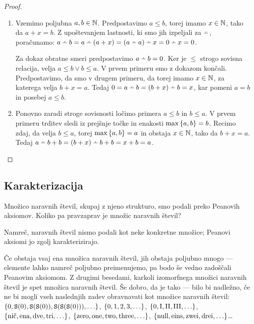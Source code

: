 \begin{proof}
\begin{enumerate}
\item
Vzemimo poljubna $a, b \in \mathbb{N}$. Predpostavimo $a \leq b$, torej imamo $x \in \mathbb{N}$, tako da $a + x = b$. Z upoštevanjem lastnosti, ki smo jih izpeljali za $\monus$, poračunamo: $a \monus b = a \monus (a + x) = (a \monus a) \monus x = 0 \monus x = 0$.

Za dokaz obratne smeri predpostavimo $a \monus b = 0$. Ker je $\leq$ strogo sovisna relacija, velja $a \leq b \lor b \leq a$. V prvem primeru smo z dokazom končali. Predpostavimo, da smo v drugem primeru, da torej imamo $x \in \mathbb{N}$, za katerega velja $b + x = a$. Tedaj $0 = a \monus b = (b + x) \monus b = x$, kar pomeni $a = b$ in posebej $a \leq b$.
\item
Ponovno zaradi stroge sovisnosti ločimo primera $a \leq b$ in $b \leq a$. V prvem primeru trditev sledi iz prejšnje točke in enakosti $\max\set{a, b} = b$. Recimo zdaj, da velja $b \leq a$, torej $\max\set{a, b} = a$ in obstaja $x \in \mathbb{N}$, tako da $b + x = a$. Tedaj $a \monus b + b = (b + x) \monus b + b = x + b = a$.
\end{enumerate}
\end{proof}

\subsection{Karakterizacija}

Množico naravnih števil, skupaj z njeno strukturo, smo podali preko Peanovih aksiomov. Koliko pa pravzaprav je množic naravnih števil?

Namreč, naravnih števil nismo podali kot neke konkretne množice; Peanovi aksiomi jo zgolj karakterizirajo. 

Če obstaja vsaj ena množica naravnih števil, jih obstaja poljubno mnogo --- elemente lahko namreč poljubno preimenujemo, pa bodo še vedno zadoščali Peanovim aksiomom. Z drugimi besedami, karkoli izomorfnega množici naravnih števil je spet množica naravnih števil. Še dobro, da je tako --- bilo bi nadležno, če ne bi mogli vseh naslednjih zadev obravnavati kot množice naravnih števil: $\set{0, \suc(0), \suc(\suc(0)), \suc(\suc(\suc(0))),\ldots}$, $\set{0, 1, 2, 3,\ldots}$, $\set{\mathrm{0}, \mathrm{I}, \mathrm{II}, \mathrm{III},\ldots}$, $\set{\text{nič}, \text{ena}, \text{dve}, \text{tri},\ldots}$, $\set{\text{zero}, \text{one}, \text{two}, \text{three},\ldots}$, $\set{\text{null}, \text{eins}, \text{zwei}, \text{drei},\ldots}$\ldots

